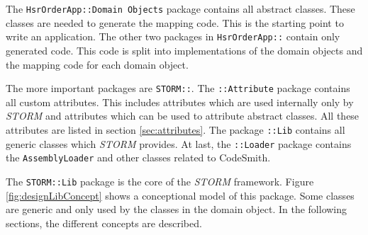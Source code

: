 		The \verb~HsrOrderApp::Domain Objects~ package contains all abstract classes. These classes
		are needed to generate the mapping code. This is the starting point to write an application.
		The other two packages in \verb~HsrOrderApp::~ contain only generated code. This code
		is split into implementations of the domain objects and the mapping code for each domain
		object.
		
		The more important packages are \verb~STORM::~. The \verb~::Attribute~ package contains
		all custom attributes. This includes attributes which are used internally only by \textit{STORM} and 
		attributes which can be used to attribute abstract classes. All these attributes are listed in section 
		\ref{sec:attributes}. The package \verb~::Lib~ contains all generic classes which \textit{STORM}
		provides. At last, the \verb~::Loader~ package contains the \verb~AssemblyLoader~ and other classes
		related to CodeSmith.
		
		The \verb~STORM::Lib~ package is the core of the \textit{STORM} framework. Figure \ref{fig:designLibConcept}
		shows a conceptional model of this package. Some classes are generic and only used
		by the classes in the domain object. In the following sections, the different concepts
		are described. 
		
